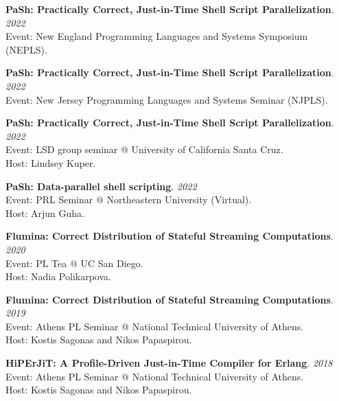 \begin{minipage}{\textwidth}
\textbf{PaSh: Practically Correct, Just-in-Time Shell Script Parallelization}. \hfill {\em 2022}\\
Event: New England Programming Languages and Systems Symposium (NEPLS).
\end{minipage}

\begin{minipage}{\textwidth}
\textbf{PaSh: Practically Correct, Just-in-Time Shell Script Parallelization}. \hfill {\em 2022}\\
Event: New Jersey Programming Languages and Systems Seminar (NJPLS).
\end{minipage}

\begin{minipage}{\textwidth}
\textbf{PaSh: Practically Correct, Just-in-Time Shell Script Parallelization}. \hfill {\em 2022}\\
Event: LSD group seminar @ University of California Santa Cruz.\\
 Host: Lindsey Kuper.
\end{minipage}

\begin{minipage}{\textwidth}
\textbf{PaSh: Data-parallel shell scripting}. \hfill {\em 2022}\\
Event: PRL Seminar @ Northeastern University (Virtual).\\
 Host: Arjun Guha.
\end{minipage}

\begin{minipage}{\textwidth}
\textbf{Flumina: Correct Distribution of Stateful Streaming Computations}. \hfill {\em 2020}\\
Event: PL Tea @ UC San Diego.\\
 Host: Nadia Polikarpova.
\end{minipage}

\begin{minipage}{\textwidth}
\textbf{Flumina: Correct Distribution of Stateful Streaming Computations}. \hfill {\em 2019}\\
Event: Athens PL Seminar @ National Technical University of Athens.\\
 Host: Kostis Sagonas and Nikos Papaspirou.
\end{minipage}

\begin{minipage}{\textwidth}
\textbf{HiPErJiT: A Profile-Driven Just-in-Time Compiler for Erlang}. \hfill {\em 2018}\\
Event: Athens PL Seminar @ National Technical University of Athens.\\
 Host: Kostis Sagonas and Nikos Papaspirou.
\end{minipage}


